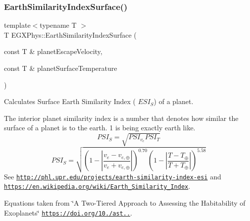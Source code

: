 \subsubsection{\texorpdfstring{Earth\+Similarity\+Index\+Surface()}{EarthSimilarityIndexSurface()}}
{\footnotesize\ttfamily template$<$typename T $>$ \\
T E\+G\+X\+Phys\+::\+Earth\+Similarity\+Index\+Surface (\begin{DoxyParamCaption}\item[{const T \&}]{planet\+Escape\+Velocity,  }\item[{const T \&}]{planet\+Surface\+Temperature }\end{DoxyParamCaption})}



Calculates Surface Earth Similarity Index ( $ESI_S$) of a planet. 

The interior planet similarity index is a number that denotes how similar the surface of a planet is to the earth. 1 is being exactly earth like. \[PSI_S=\sqrt{PSI_{v_e} PSI_T}\] \[PSI_S=\sqrt{\left ( 1 - \left | \frac{v_e-v_{e,\oplus}}{v_e+v_{e,\oplus}} \right | \right )^{0.70} \left ( 1 - \left | \frac{T-T_{\oplus}}{T+T_{\oplus}} \right | \right )^{5.58}}\] See \href{http://phl.upr.edu/projects/earth-similarity-index-esi}{\tt http\+://phl.\+upr.\+edu/projects/earth-\/similarity-\/index-\/esi} and \href{https://en.wikipedia.org/wiki/Earth_Similarity_Index}{\tt https\+://en.\+wikipedia.\+org/wiki/\+Earth\+\_\+\+Similarity\+\_\+\+Index}.

Equations taken from \char`\"{}\+A Two-\/\+Tiered Approach to Assessing the Habitability of Exoplanets\char`\"{} \href{https://doi.org/10.1089/ast.2010.0592}{\tt https\+://doi.\+org/10./ast..}.



